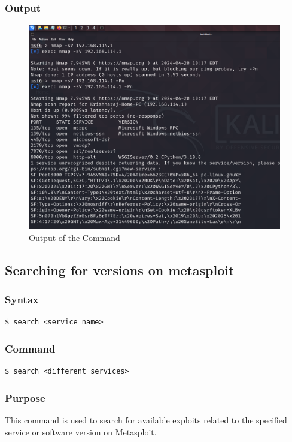 \documentclass[11pt]{article}
\begin{document}
\subsubsection*{Output}
\begin{figure}[H]
    \centering
    \includegraphics[width=0.99\textwidth]{a3_ss (16).png}
    \caption{Output of the Command}
\end{figure}
\subsection{Searching for versions on metasploit}

\subsubsection*{Syntax}
\begin{verbatim}
$ search <service_name>
\end{verbatim}

\subsubsection*{Command}
\begin{verbatim}
$ search <different services>
\end{verbatim}

\subsubsection*{Purpose}
This command is used to search for available exploits related to the specified service or software version on Metasploit.
\end{document}
